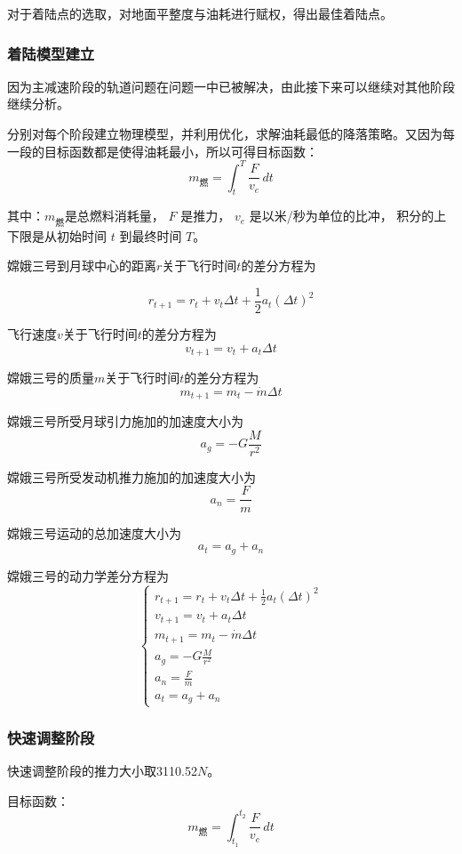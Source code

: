 \documentclass{ctexart}
\begin{document}
对于着陆点的选取，对地面平整度与油耗进行赋权，得出最佳着陆点。

\subsubsection{着陆模型建立}
因为主减速阶段的轨道问题在问题一中已被解决，由此接下来可以继续对其他阶段继续分析。

分别对每个阶段建立物理模型，并利用优化，求解油耗最低的降落策略。又因为每一段的目标函数都是使得油耗最小，所以可得目标函数：
\begin{equation}
m_{\text{燃}} = \int_{t}^{T} \frac{F}{v_e} \, dt
\end{equation}


其中：$m_{\text{燃}}$是总燃料消耗量，
$F$ 是推力，
$v_e$ 是以米/秒为单位的比冲，
积分的上下限是从初始时间 $t$ 到最终时间 $T$。


嫦娥三号到月球中心的距离\(r\)关于飞行时间\(t\)的差分方程为

\[r_{t+1} = r_t + v_t \Delta t + \frac{1}{2} a_t (\Delta t)^2\]

飞行速度\(v\)关于飞行时间\(t\)的差分方程为
\[v_{t+1} = v_t + a_t \Delta t\]

嫦娥三号的质量\(m\)关于飞行时间\(t\)的差分方程为
\[m_{t+1} = m_t - \dot{m} \Delta t\]

嫦娥三号所受月球引力施加的加速度大小为
\[a_g = - G \frac{M}{r^2}\]

嫦娥三号所受发动机推力施加的加速度大小为
\[a_n = \frac{F}{m}\]

嫦娥三号运动的总加速度大小为
\[a_t = a_g + a_n\]

嫦娥三号的动力学差分方程为
\[
\begin{cases}
r_{t+1} = r_t + v_t \Delta t + \frac{1}{2} a_t (\Delta t)^2 \\
v_{t+1} = v_t + a_t \Delta t \\
m_{t+1} = m_t - \dot{m} \Delta t \\
a_g = - G \frac{M}{r^2} \\
a_n = \frac{F}{m} \\
a_t = a_g + a_n
\end{cases}
\]

\subsubsection{快速调整阶段}
快速调整阶段的推力大小取3110.52\(N\)。

目标函数：
\begin{equation}
m_{\text{燃}} = \int_{t_1}^{t_2} \frac{F}{v_e} \, dt
\end{equation}
\end{document}
